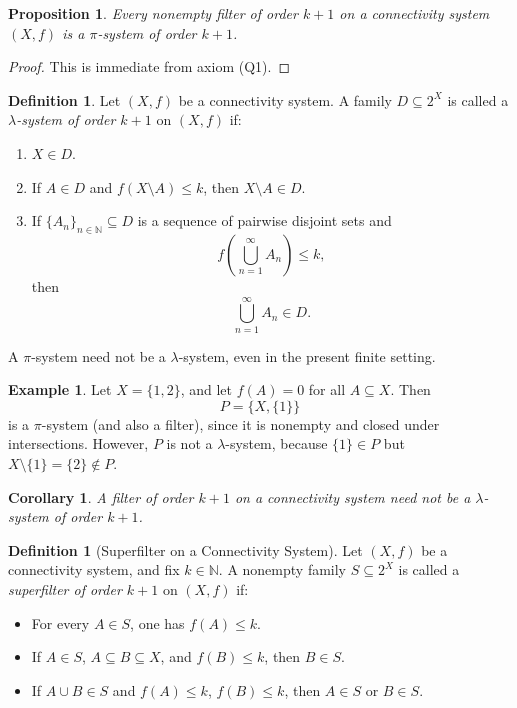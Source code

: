 \documentclass[10pt]{book}
\newtheorem{corollary}[theorem]{Corollary}
\newtheorem{proposition}[theorem]{Proposition}
\theoremstyle{definition}
\newtheorem{definition}[theorem]{Definition}
\newtheorem{example}[theorem]{Example}
\begin{document}
\begin{proposition}
Every nonempty filter of order \(k+1\) on a connectivity system \((X,f)\) is a \(\pi\)-system of order \(k+1\).
\end{proposition}

\begin{proof}
This is immediate from axiom (Q1).
\end{proof}

\begin{definition}
Let \((X,f)\) be a connectivity system.  
A family \(D\subseteq 2^X\) is called a \emph{\(\lambda\)-system of order \(k+1\)} on \((X,f)\) if:
\begin{enumerate}
    \item[(L1)] \(X\in D\).
    \item[(L2)] If \(A\in D\) and \(f(X\setminus A)\leq k\), then \(X\setminus A\in D\).
    \item[(L3)] If \(\{A_n\}_{n\in\mathbb{N}}\subseteq D\) is a sequence of pairwise disjoint sets and
    \[
    f\!\left(\bigcup_{n=1}^{\infty} A_n\right)\leq k,
    \]
    then
    \[
    \bigcup_{n=1}^{\infty} A_n \in D.
    \]
\end{enumerate}
\end{definition}

A \(\pi\)-system need not be a \(\lambda\)-system, even in the present finite setting.

\begin{example}
Let \(X=\{1,2\}\), and let \(f(A)=0\) for all \(A\subseteq X\).  
Then
\[
P=\bigl\{X,\{1\}\bigr\}
\]
is a \(\pi\)-system (and also a filter), since it is nonempty and closed under intersections.  
However, \(P\) is not a \(\lambda\)-system, because \(\{1\}\in P\) but \(X\setminus \{1\}=\{2\}\notin P\).
\end{example}

\begin{corollary}
A filter of order \(k+1\) on a connectivity system need not be a \(\lambda\)-system of order \(k+1\).
\end{corollary}

\begin{definition}[Superfilter on a Connectivity System]
Let \((X,f)\) be a connectivity system, and fix \(k\in \mathbb{N}\).  
A nonempty family \(S\subseteq 2^X\) is called a \emph{superfilter of order \(k+1\)} on \((X,f)\) if:
\begin{itemize}
    \item[(SUF1)] For every \(A\in S\), one has \(f(A)\leq k\).
    \item[(SUF2)] If \(A\in S\), \(A\subseteq B\subseteq X\), and \(f(B)\leq k\), then \(B\in S\).
    \item[(SUF3)] If \(A\cup B\in S\) and \(f(A)\leq k\), \(f(B)\leq k\), then \(A\in S\) or \(B\in S\).
\end{itemize}
\end{definition}
\end{document}
